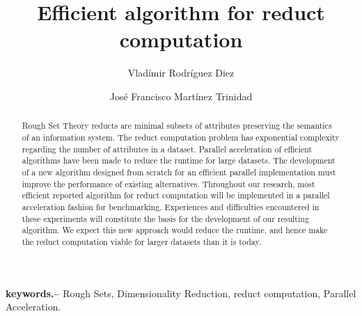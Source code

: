 \documentclass[11pt]{article}   %
\begin{document}
\title{Efficient algorithm for reduct computation}
\author{Vlad\'imir Rodr\'iguez Diez \and Jos\'e Francisco Mart\'inez Trinidad
 }
\maketitle


\begin{abstract}
    Rough Set Theory reducts are minimal subsets of attributes preserving the semantics of an 
    information system. The reduct computation problem has exponential complexity regarding the number of 
    attributes in a dataset. Parallel acceleration of efficient algorithms have been made to
    reduce the runtime for large datasets. The development of a new algorithm designed from scratch
    for an efficient parallel implementation must improve the performance of existing alternatives. 
    Throughout our research, most efficient reported algorithm for reduct computation will be 
    implemented in a parallel acceleration fashion for benchmarking. Experiences and difficulties 
    encountered in these experiments will constitute the basis for the development of our resulting algorithm. 
    We expect this new approach would reduce the runtime, and hence make the reduct computation viable for 
    larger datasets than it is today.
\end{abstract}

\textbf{keywords.--} Rough Sets, Dimensionality Reduction, reduct computation, Parallel Acceleration.

\pagebreak 
\tableofcontents
\pagebreak 

\end{document}

